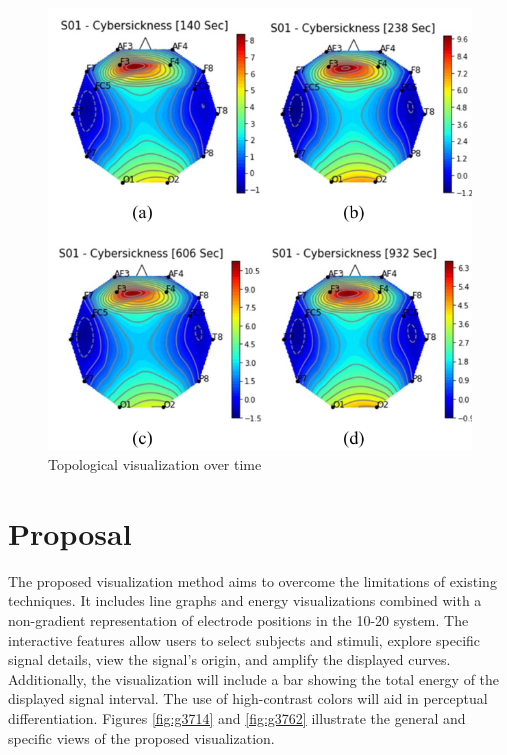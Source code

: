 \documentclass[format=sigconf]{acmart}
\begin{document}
			\begin{figure}[h]
				\centering
				\includegraphics[width=\linewidth]{../presentation/images/visu02}
				\caption{Topological visualization over time}
				\label{fig:visu02}
			\end{figure}
	
	\section{Proposal}
		\par The proposed visualization method aims to overcome the limitations of existing techniques. It includes line graphs and energy visualizations combined with a non-gradient representation of electrode positions in the 10-20 system. The interactive features allow users to select subjects and stimuli, explore specific signal details, view the signal's origin, and amplify the displayed curves. Additionally, the visualization will include a bar showing the total energy of the displayed signal interval. The use of high-contrast colors will aid in perceptual differentiation. Figures \ref{fig:g3714} and \ref{fig:g3762} illustrate the general and specific views of the proposed visualization.
	
\end{document}
